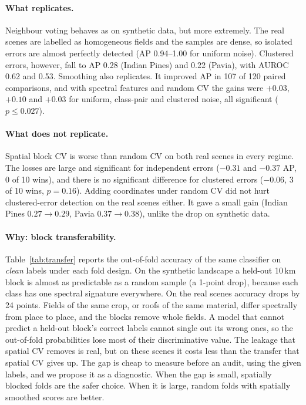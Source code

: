 \documentclass[11pt]{article}
\begin{document}
\paragraph{What replicates.}
Neighbour voting behaves as on synthetic data, but more extremely. The real
scenes are labelled as homogeneous fields and the samples are dense, so isolated
errors are almost perfectly detected (AP 0.94--1.00 for uniform noise). Clustered
errors, however, fall to AP 0.28 (Indian Pines) and 0.22 (Pavia), with AUROC 0.62
and 0.53. Smoothing also replicates. It improved AP in 107 of 120 paired
comparisons, and with spectral features and random CV the gains were $+0.03$,
$+0.10$ and $+0.03$ for uniform, class-pair and clustered noise, all significant
($p\le0.027$).

\paragraph{What does not replicate.}
Spatial block CV is worse than random CV on both real scenes in every regime. The
losses are large and significant for independent errors ($-0.31$ and $-0.37$ AP,
0 of 10 wins), and there is no significant difference for clustered errors
($-0.06$, 3 of 10 wins, $p=0.16$). Adding coordinates under random CV did not hurt
clustered-error detection on the real scenes either. It gave a small gain (Indian
Pines $0.27\to0.29$, Pavia $0.37\to0.38$), unlike the drop on synthetic data.

\paragraph{Why: block transferability.}
Table~\ref{tab:transfer} reports the out-of-fold accuracy of the same classifier
on \emph{clean} labels under each fold design. On the synthetic landscape a
held-out 10\,km block is almost as predictable as a random sample (a 1-point
drop), because each class has one spectral signature everywhere. On the real
scenes accuracy drops by 24 points. Fields of the same crop, or roofs of the same
material, differ spectrally from place to place, and the blocks remove whole
fields. A model that cannot predict a held-out block's correct labels cannot
single out its wrong ones, so the out-of-fold probabilities lose most of their
discriminative value. The leakage that spatial CV removes is real, but on these
scenes it costs less than the transfer that spatial CV gives up. The gap is cheap
to measure before an audit, using the given labels, and we propose it as a
diagnostic. When the gap is small, spatially blocked folds are the safer choice.
When it is large, random folds with spatially smoothed scores are better.
\end{document}
